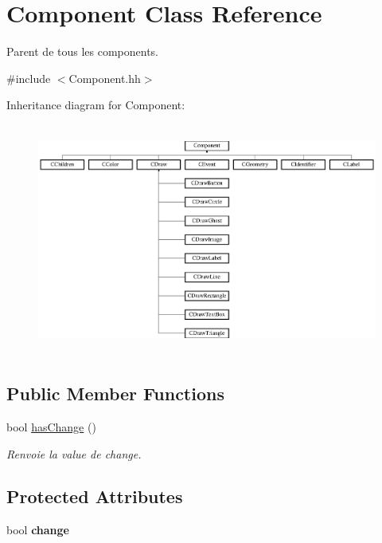 \hypertarget{class_component}{}\section{Component Class Reference}
\label{class_component}


Parent de tous les components.  




{\ttfamily \#include $<$Component.\+hh$>$}

Inheritance diagram for Component\+:\begin{figure}[H]
\begin{center}
\leavevmode
\includegraphics[height=7.652174cm]{class_component}
\end{center}
\end{figure}
\subsection*{Public Member Functions}
\begin{DoxyCompactItemize}
\item 
bool \hyperlink{class_component_a9f4ff1993db2a1694fabd7bd6e63af2a}{has\+Change} ()
\begin{DoxyCompactList}\small\item\em Renvoie la value de change. \end{DoxyCompactList}\end{DoxyCompactItemize}
\subsection*{Protected Attributes}
\begin{DoxyCompactItemize}
\item 
\hypertarget{class_component_a0f4af849e74141ff37e0bae44a667269}{}bool {\bfseries change}\label{class_component_a0f4af849e74141ff37e0bae44a667269}

\end{DoxyCompactItemize}


